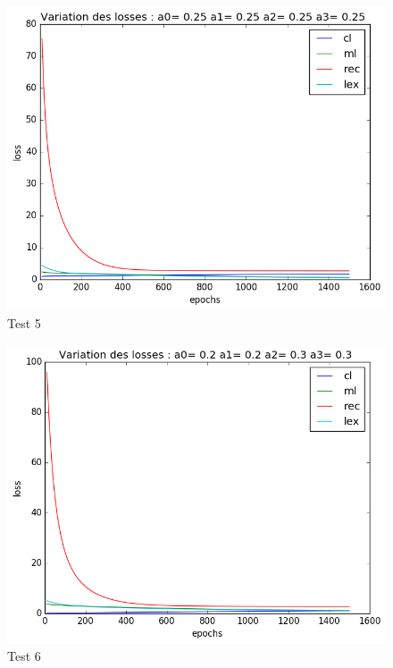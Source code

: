 \documentclass{article}
\begin{document}
\begin{figure}[!h]
  \centering
  \includegraphics[scale=0.8]{img/loss/test5.png}
  \caption{Test 5}
\end{figure}
\begin{figure}[!h]
  \centering
  \includegraphics[scale=0.8]{img/loss/test6.png}
  \caption{Test 6}
\end{figure}
\end{document}
